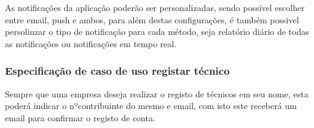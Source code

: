 As notificações da aplicação poderão ser personalizadas, sendo possível escolher entre email, push e ambos,
para além destas configurações, é também possivel persolinzar o tipo de notificação para cada método, seja 
relatório diário de todas as notificações ou notificações em tempo real.



\subsubsection{Especificação de caso de uso registar técnico}

Sempre que uma empresa deseja realizar o registo de técnicos em seu nome, esta poderá indicar o nºcontribuinte
do mesmo e email, com isto este receberá um email para confirmar o registo de conta.






% 




% 



